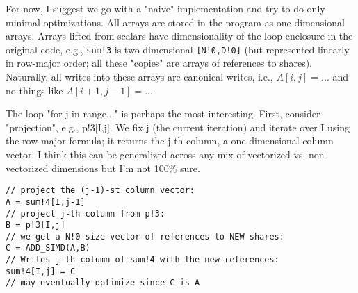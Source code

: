 
For now, I suggest we go with a "naive" implementation and try to do only minimal optimizations. 
All arrays are stored in the program as one-dimensional arrays. Arrays lifted from scalars have dimensionality of the loop enclosure in 
the original code, e.g., \texttt{sum!3} is two dimensional \texttt{[N!0,D!0]} (but represented linearly in row-major order; all these "copies" are 
arrays of references to shares). Naturally, all writes into these arrays are canonical writes, i.e., $A[i,j] = ...$ and no things like $A[i+1,j-1] = ...$.

The loop "for j in range..." is perhaps the most interesting. First, consider "projection", e.g., p!3[I,j]. 
We fix j (the current iteration) and iterate over I using the row-major formula; it returns the j-th column, 
a one-dimensional column vector. I think this can be generalized across any mix of vectorized vs. 
non-vectorized dimensions but I'm not 100\% sure.

\begin{verbatim}
// project the (j-1)-st column vector:
A = sum!4[I,j-1]
// project j-th column from p!3: 
B = p!3[I,j] 
// we get a N!0-size vector of references to NEW shares:
C = ADD_SIMD(A,B) 
// Writes j-th column of sum!4 with the new references:
sum!4[I,j] = C 
// may eventually optimize since C is A
\end{verbatim}


%
